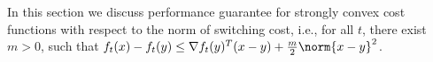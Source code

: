 In this section we discuss performance guarantee for strongly convex cost functions with respect to the norm of switching cost, i.e., for all $t$, there exist $m>0$, such that $f_t(x) - f_t(y) \le \nabla f_t(y)^T (x-y) + \frac{m}{2}\norm{x-y}^2$. 

%
%
%